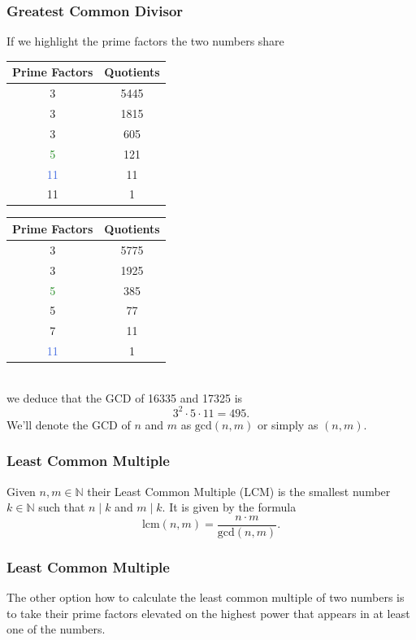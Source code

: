 \documentclass[aspectratio=169,11pt,usenames,dvipsnames]{beamer}
\newcommand{\clr}{\textcolor{BrickRed}}
\newcommand{\clb}{\textcolor{RoyalBlue}}
\newcommand{\clg}{\textcolor{ForestGreen}}
\newcommand{\N}{\mathbb{N}}
\begin{document}
\begin{frame}
 \frametitle{Greatest Common Divisor}
 If we highlight the prime factors the two numbers share\\
 \vspace{1em}
 \begin{minipage}{.48\textwidth}
  \centering
   \begin{tabular}{c|c}
    \textbf{Prime Factors} & \textbf{Quotients}\\
    \toprule
    \clr{3} & 5445\\
    \clr{3} & 1815\\
    3 & 605\\
    \clg{5} & 121\\
    \clb{11} & 11\\
    11 & 1
  \end{tabular}
 \end{minipage}
 \begin{minipage}{.48\textwidth}
   \begin{tabular}{c|c}
    \textbf{Prime Factors} & \textbf{Quotients}\\
    \toprule
    \clr{3} & 5775\\
    \clr{3} & 1925\\
    \clg{5} & 385\\
    5 & 77\\
    7 & 11\\
    \clb{11} & 1
  \end{tabular}
 \end{minipage}\\
 \pause
 \vspace{1em}
 we deduce that the GCD of 16335 and 17325 is
 \[
  3^2 \cdot 5 \cdot 11 = 495.
 \]
 \pause
 We'll denote the GCD of $n$ and $m$ as $\mathrm{gcd}(n,m)$ or simply as
 $(n,m)$.
\end{frame}

\begin{frame}
 \frametitle{Least Common Multiple}
 \begin{tcolorbox}[title=Least Common Multiple]
  Given $n,m \in \N$ their \alert{Least Common Multiple} (LCM) is the
  \alert{smallest} number $k \in \N$ such that $n \mid k$ and $m \mid k$.
  \pause
  It is given by the formula
  \[
   \mathrm{lcm}(n,m) = \frac{n \cdot m}{\mathrm{gcd}(n,m)}.
  \]
 \end{tcolorbox}
\end{frame}

\begin{frame}
 \frametitle{Least Common Multiple}
 The other option how to calculate the least common multiple of two numbers is
 to take their prime factors elevated on the highest power that appears in at
 least one of the numbers.
\end{frame}
\end{document}
